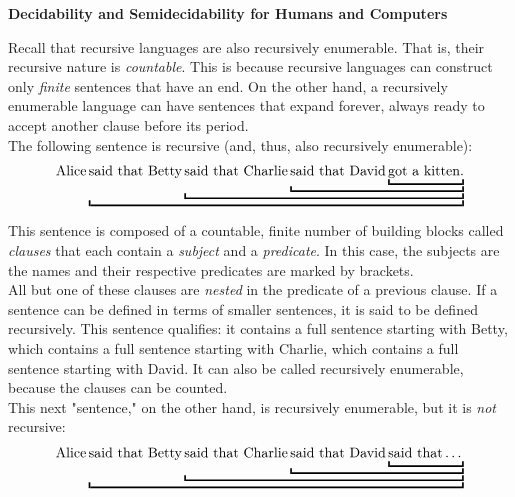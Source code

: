 \begin{tcolorbox}[breakable, enhanced, colback=textbook-blue, sharp corners]
	\vspace{3mm}
	
	\begin{center}
		\textbf{Decidability and Semidecidability for Humans and Computers}
	\end{center}

	Recall that recursive languages are also recursively enumerable. That is, their recursive nature is \textit{countable}. This is because recursive languages can construct only \textit{finite} sentences that have an end. On the other hand, a recursively enumerable language can have sentences that expand forever, always ready to accept another clause before its period. \\
	
	The following sentence is recursive (and, thus, also recursively enumerable): 
	\begin{align*}
		\textnormal{Alice} 
		\underbracket{\textnormal{said that Betty}
		\underbracket{\textnormal{said that Charlie}
		\underbracket{\textnormal{said that David}
		\underbracket{\textnormal{got a kitten.}}}}}
	\end{align*}
	\vspace{1mm}
	
	This sentence is composed of a countable, finite number of building blocks called \textit{clauses} that each contain a \textit{subject} and a \textit{predicate}. In this case, the subjects are the names and their respective predicates are marked by brackets. \\
	
	All but one of these clauses are \textit{nested} in the predicate of a previous clause. If a sentence can be defined in terms of smaller sentences, it is said to be defined recursively. This sentence qualifies: it contains a full sentence starting with Betty, which contains a full sentence starting with Charlie, which contains a full sentence starting with David. It can also be called recursively enumerable, because the clauses can be counted. \\
	
	This next "sentence," on the other hand, is recursively enumerable, but it is \textit{not} recursive:
	\begin{align*}
	\textnormal{Alice} 
	\underbracket{\textnormal{said that Betty}
		\underbracket{\textnormal{said that Charlie}
			\underbracket{\textnormal{said that David}
				\underbracket{\textnormal{said that}\dots\vphantom{\textnormal{g}}}}}}
	\end{align*}
	\vspace{1mm}
	

\end{tcolorbox}
